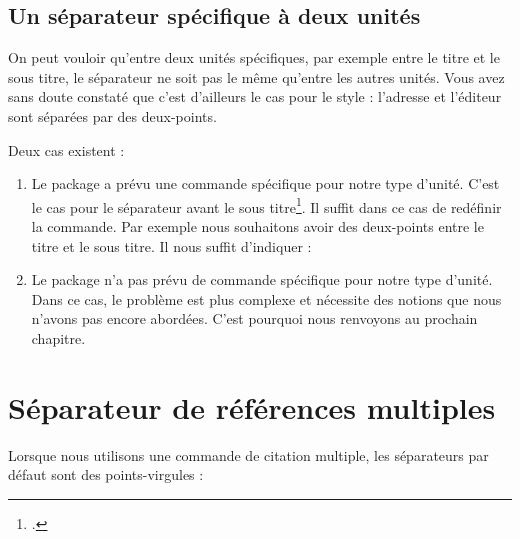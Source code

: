     
\subsection{Un séparateur spécifique à deux unités}
    
    On peut vouloir qu'entre deux unités spécifiques, par exemple entre le titre et le sous titre, le séparateur ne soit pas le même qu'entre les autres unités.    Vous avez sans doute constaté que c'est d'ailleurs le cas pour le style  : l'adresse et l'éditeur sont séparées par des deux-points.
    
    Deux cas existent :
        \begin{enumerate}
            \item Le package  a prévu une commande spécifique pour notre type d'unité. C'est le cas pour le séparateur avant le sous titre\footcite[Ces commandes sont peu nombreuses : on les trouvera dans][]{biblatex_hooks}. Il suffit dans ce cas de redéfinir la commande. Par exemple nous souhaitons avoir des deux-points entre le titre et le sous titre. Il nous suffit d'indiquer :
            
            \begin{latexcode}
\renewcommand{\subtitlepunct}[0]{\addspace\addcolon\addspace}
            \end{latexcode}

            
            \item Le package n'a pas prévu de commande spécifique pour notre type d'unité. Dans ce cas, le problème est plus complexe et nécessite des notions que nous n'avons pas encore abordées. C'est pourquoi nous renvoyons au prochain chapitre.
        \end{enumerate}
        
\section{Séparateur de références multiples}\label{multicitedelim}

Lorsque nous utilisons une commande de citation multiple, les séparateurs par défaut sont des points-virgules :


\begin{latexcode}
\autocites{Saxer1980}{Junod1992}
\end{latexcode}

\bibverbose
\begin{quotation}
\cites{Saxer1980}{Junod1992}
\end{quotation}
\bibverbosetrad

